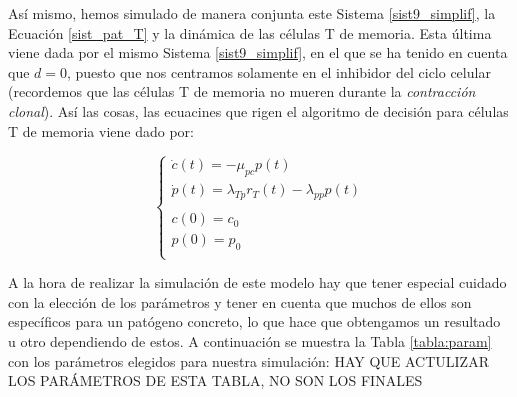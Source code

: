 Así mismo, hemos simulado de manera conjunta este Sistema \ref{sist9_simplif}, la Ecuación \ref{sist_pat_T} y la dinámica de las células T de memoria. Esta última viene dada por el mismo Sistema \ref{sist9_simplif}, en el que se ha tenido en cuenta que $d=0$, puesto que nos centramos solamente en el inhibidor del ciclo celular (recordemos que las células T de memoria no mueren durante la \textit{contracción clonal}). Así las cosas, las ecuacines que rigen el algoritmo de decisión para células T de memoria viene dado por: 

\begin{equation}
	\label{sist15_simplif}
	\left\{ \begin{array}{l}
	\dot{c}(t) = -\mu_{pc}p(t) \\
	\dot{p}(t) = \lambda_{Tp}r_{T}(t) - \lambda_{pp}p(t) \\
	\\
	c(0)=c_0 \\
	p(0)=p_0 \\
	\end{array}
	\right.
\end{equation}


A la hora de realizar la simulación de este modelo hay que tener especial cuidado con la elección de los parámetros y tener en cuenta que muchos de ellos son específicos para un patógeno concreto, lo que hace que obtengamos un resultado u otro dependiendo de estos. A continuación se muestra la Tabla \ref{tabla:param} con los parámetros elegidos para nuestra simulación:
HAY QUE ACTULIZAR LOS PARÁMETROS DE ESTA TABLA, NO SON LOS FINALES

